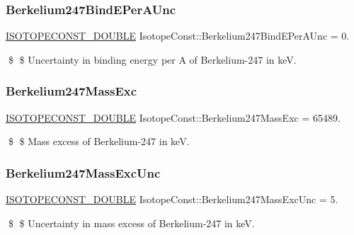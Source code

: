 \subsubsection{\texorpdfstring{Berkelium247\+Bind\+E\+Per\+A\+Unc}{Berkelium247BindEPerAUnc}}
{\footnotesize\ttfamily \mbox{\hyperlink{group___isotope_const-_macros_ga8f45a7272ce02c0b4c65c44636ed719a}{I\+S\+O\+T\+O\+P\+E\+C\+O\+N\+S\+T\+\_\+\+D\+O\+U\+B\+LE}} Isotope\+Const\+::\+Berkelium247\+Bind\+E\+Per\+A\+Unc = 0.}

\$ \$ Uncertainty in binding energy per A of Berkelium-\/247 in keV. \mbox{\label{group___isotope_const-_berkelium-_bk247_gab03ddb5f41857f4b00153ce704f20b7d}} 
\subsubsection{\texorpdfstring{Berkelium247\+Mass\+Exc}{Berkelium247MassExc}}
{\footnotesize\ttfamily \mbox{\hyperlink{group___isotope_const-_macros_ga8f45a7272ce02c0b4c65c44636ed719a}{I\+S\+O\+T\+O\+P\+E\+C\+O\+N\+S\+T\+\_\+\+D\+O\+U\+B\+LE}} Isotope\+Const\+::\+Berkelium247\+Mass\+Exc = 65489.}

\$ \$ Mass excess of Berkelium-\/247 in keV. \mbox{\label{group___isotope_const-_berkelium-_bk247_ga701247da147e42e6645a3b2cc1881e4e}} 
\subsubsection{\texorpdfstring{Berkelium247\+Mass\+Exc\+Unc}{Berkelium247MassExcUnc}}
{\footnotesize\ttfamily \mbox{\hyperlink{group___isotope_const-_macros_ga8f45a7272ce02c0b4c65c44636ed719a}{I\+S\+O\+T\+O\+P\+E\+C\+O\+N\+S\+T\+\_\+\+D\+O\+U\+B\+LE}} Isotope\+Const\+::\+Berkelium247\+Mass\+Exc\+Unc = 5.}

\$ \$ Uncertainty in mass excess of Berkelium-\/247 in keV. \mbox{\label{group___isotope_const-_berkelium-_bk247_ga4368e1f287744dd6c74521cd96010827}} 

